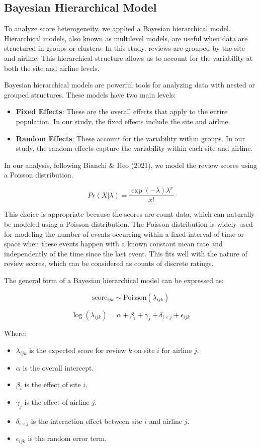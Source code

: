 \documentclass[
]{agujournal2019}
\providecommand{\tightlist}{%
  \setlength{\itemsep}{0pt}\setlength{\parskip}{0pt}}\usepackage{longtable,booktabs,array}
\begin{document}
\subsection{Bayesian Hierarchical
Model}\label{bayesian-hierarchical-model}

To analyze score heterogeneity, we applied a Bayesian hierarchical
model. Hierarchical models, also known as multilevel models, are useful
when data are structured in groups or clusters. In this study, reviews
are grouped by the site and airline. This hierarchical structure allows
us to account for the variability at both the site and airline levels.

Bayesian hierarchical models are powerful tools for analyzing data with
nested or grouped structures. These models have two main levels:

\begin{itemize}
\tightlist
\item
  \textbf{Fixed Effects}: These are the overall effects that apply to
  the entire population. In our study, the fixed effects include the
  site and airline.
\item
  \textbf{Random Effects}: These account for the variability within
  groups. In our study, the random effects capture the variability
  within each site and airline.
\end{itemize}

In our analysis, following Bianchi \& Heo (2021), we model the review
scores using a Poisson distribution.

\[
Pr(X\vert \lambda)=\frac{\exp{(-\lambda)}\lambda^x}{x!}
\]

This choice is appropriate because the scores are count data, which can
naturally be modeled using a Poisson distribution. The Poisson
distribution is widely used for modeling the number of events occurring
within a fixed interval of time or space when these events happen with a
known constant mean rate and independently of the time since the last
event. This fits well with the nature of review scores, which can be
considered as counts of discrete ratings.

The general form of a Bayesian hierarchical model can be expressed as:

\[
\text{score}_{ijk} \sim \text{Poisson}(\lambda_{ijk})
\]

\[
\log(\lambda_{ijk}) = \alpha + \beta_{i} + \gamma_{j} + \delta_{i \times j} + \epsilon_{ijk}
\]

Where:

\begin{itemize}
\tightlist
\item
  \(\lambda_{ijk}\) is the expected score for review \(k\) on site \(i\)
  for airline \(j\).
\item
  \(\alpha\) is the overall intercept.
\item
  \(\beta_{i}\) is the effect of site \(i\).
\item
  \(\gamma_{j}\) is the effect of airline \(j\).
\item
  \(\delta_{i \times j}\) is the interaction effect between site \(i\)
  and airline \(j\).
\item
  \(\epsilon_{ijk}\) is the random error term.
\end{itemize}
\end{document}
